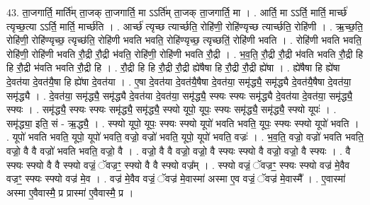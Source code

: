 \documentclass[17pt]{extarticle}
\begin{document}
43. ता॒जगार्ति॒ मार्ति॑म् ता॒जक् ता॒जगार्ति॒ मा ऽऽर्ति॑म् ता॒जक् ता॒जगार्ति॒ मा । . आर्ति॒ मा ऽऽर्ति॒ मार्ति॒ मार्च्छ॑ त्यृच्छ॒त्या ऽऽर्ति॒ मार्ति॒ मार्च्छ॑ति । . आर्च्छ॑ त्यृच्छ त्यार्च्छति॒ रोहि॑णी॒ रोहि॑ण्यृच्छ त्यार्च्छति॒ रोहि॑णी । . ऋ॒च्छ॒ति॒ रोहि॑णी॒ रोहि॑ण्यृच्छ॒ त्यृच्छ॑ति॒ रोहि॑णी भवति भवति॒ रोहि॑ण्यृच्छ॒ त्यृच्छति॒॑ रोहि॑णी भवति । . रोहि॑णी भवति भवति॒ रोहि॑णी॒ रोहि॑णी भवति रौ॒द्री रौ॒द्री भ॑वति॒ रोहि॑णी॒ रोहि॑णी भवति रौ॒द्री । . भ॒व॒ति॒ रौ॒द्री रौ॒द्री भ॑वति भवति रौ॒द्री हि हि रौ॒द्री भ॑वति भवति रौ॒द्री हि । . रौ॒द्री हि हि रौ॒द्री रौ॒द्री ह्ये॑षैषा हि रौ॒द्री रौ॒द्री ह्ये॑षा । . ह्ये॑षैषा हि ह्ये॑षा दे॒वत॑या दे॒वत॑यै॒षा हि ह्ये॑षा दे॒वत॑या । . ए॒षा दे॒वत॑या दे॒वत॑यै॒षैषा दे॒वत॑या॒ समृ॑द्ध्यै॒ समृ॑द्ध्यै दे॒वत॑यै॒षैषा दे॒वत॑या॒ समृ॑द्ध्यै । . दे॒वत॑या॒ समृ॑द्ध्यै॒ समृ॑द्ध्यै दे॒वत॑या दे॒वत॑या॒ समृ॑द्ध्यै॒ स्फ्यः स्फ्यः समृ॑द्ध्यै दे॒वत॑या दे॒वत॑या॒ समृ॑द्ध्यै॒ स्फ्यः । . समृ॑द्ध्यै॒ स्फ्यः स्फ्यः समृ॑द्ध्यै॒ समृ॑द्ध्यै॒ स्फ्यो यूपो॒ यूपः॒ स्फ्यः समृ॑द्ध्यै॒ समृ॑द्ध्यै॒ स्फ्यो यूपः॑ । . समृ॑द्ध्या॒ इति॒ सं - ऋ॒द्ध्यै॒ । . स्फ्यो यूपो॒ यूपः॒ स्फ्यः स्फ्यो यूपो॑ भवति भवति॒ यूपः॒ स्फ्यः स्फ्यो यूपो॑ भवति । . यूपो॑ भवति भवति॒ यूपो॒ यूपो॑ भवति॒ वज्रो॒ वज्रो॑ भवति॒ यूपो॒ यूपो॑ भवति॒ वज्रः॑ । . भ॒व॒ति॒ वज्रो॒ वज्रो॑ भवति भवति॒ वज्रो॒ वै वै वज्रो॑ भवति भवति॒ वज्रो॒ वै । . वज्रो॒ वै वै वज्रो॒ वज्रो॒ वै स्फ्यः स्फ्यो वै वज्रो॒ वज्रो॒ वै स्फ्यः । . वै स्फ्यः स्फ्यो वै वै स्फ्यो वज्रं॒ ॅवज्रꣳ॒॒ स्फ्यो वै वै स्फ्यो वज्र᳚म् । . स्फ्यो वज्रं॒ ॅवज्रꣳ॒॒ स्फ्यः स्फ्यो वज्र॑ मे॒वैव वज्रꣳ॒॒ स्फ्यः स्फ्यो वज्र॑ मे॒व । . वज्र॑ मे॒वैव वज्रं॒ ॅवज्र॑ मे॒वास्मा॑ अस्मा ए॒व वज्रं॒ ॅवज्र॑ मे॒वास्मै᳚ । . ए॒वास्मा॑ अस्मा ए॒वैवास्मै॒ प्र प्रास्मा॑ ए॒वैवास्मै॒ प्र । \newline
\end{document}
